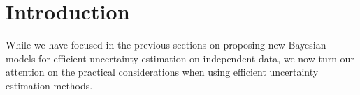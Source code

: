 \section{Introduction}


While we have focused in the previous sections on proposing new Bayesian models for efficient uncertainty estimation on independent data, we now turn our attention on the practical considerations when using efficient uncertainty estimation methods. 

